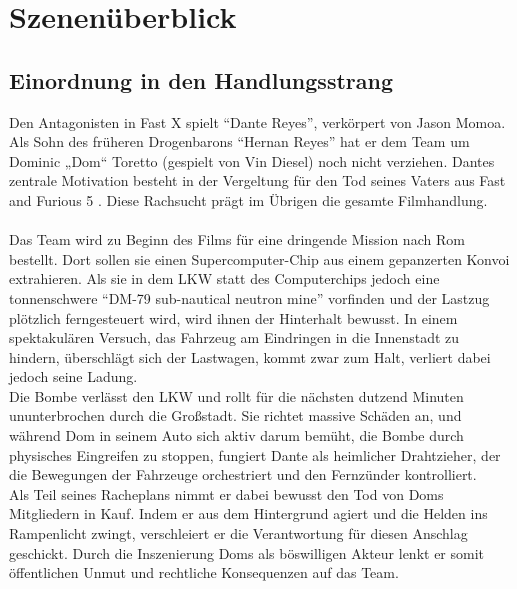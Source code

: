 \section{Szenenüberblick}

\subsection{Einordnung in den Handlungsstrang}
Den Antagonisten in Fast X spielt \enquote{Dante Reyes}, verkörpert von Jason Momoa.
Als Sohn des früheren Drogenbarons \enquote{Hernan Reyes}\parencite{HernanReyesFFfandom} hat er dem Team um Dominic „Dom“ Toretto (gespielt von Vin Diesel) noch nicht verziehen. Dantes zentrale Motivation besteht in der Vergeltung für den Tod seines Vaters aus Fast and Furious 5 \parencite{HernanReyesFFfandom}. Diese Rachsucht prägt im Übrigen die gesamte Filmhandlung\parencites{fastXfandom}{fastXwiki}.
\\
\\
Das Team wird zu Beginn des Films für eine dringende Mission nach Rom bestellt.
Dort sollen sie einen Supercomputer-Chip aus einem gepanzerten Konvoi extrahieren.
Als sie in dem LKW statt des Computerchips jedoch eine tonnenschwere \enquote{DM-79 sub-nautical neutron mine}\parencite{fastXwiki} vorfinden und der Lastzug plötzlich ferngesteuert wird, wird ihnen der Hinterhalt bewusst.
In einem spektakulären Versuch, das Fahrzeug am Eindringen in die Innenstadt zu hindern, überschlägt sich der Lastwagen, kommt zwar zum Halt, verliert dabei jedoch seine Ladung. 
\\
Die Bombe verlässt den LKW und rollt für die nächsten dutzend Minuten ununterbrochen durch die Großstadt. Sie richtet massive Schäden an, und während Dom in seinem Auto sich aktiv darum bemüht, die Bombe durch physisches Eingreifen zu stoppen, fungiert Dante als heimlicher Drahtzieher, der die Bewegungen der Fahrzeuge orchestriert und den Fernzünder kontrolliert.
\\
Als Teil seines Racheplans nimmt er dabei bewusst den Tod von Doms Mitgliedern in Kauf.
Indem er aus dem Hintergrund agiert und die Helden ins Rampenlicht zwingt, verschleiert er die Verantwortung für diesen Anschlag geschickt. 
Durch die Inszenierung Doms als böswilligen Akteur lenkt er somit öffentlichen Unmut und rechtliche Konsequenzen auf das Team\parencites{fastXfandom}{fastXwiki}.








